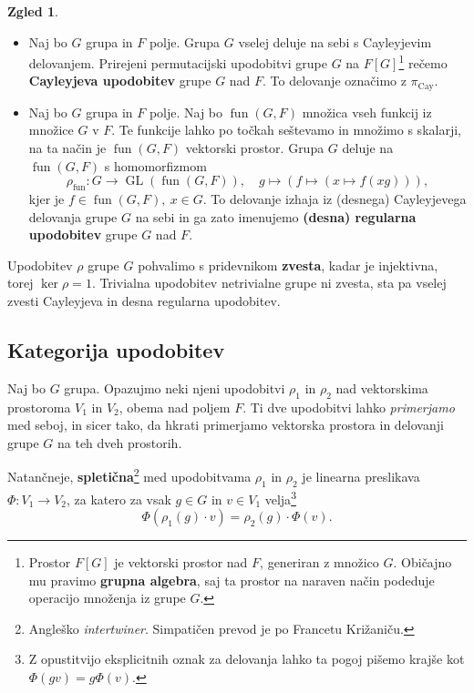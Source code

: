 \documentclass[11pt]{book}
\DeclareMathOperator\fun{fun}
\DeclareMathOperator\GL{GL}
\DeclareMathOperator\Cay{Cay}
\def\definicija{\color{rdeca}\bf}
\theoremstyle{definition}
\theoremstyle{zgled}
\newtheorem{zgled}[theorem]{Zgled}
\theoremstyle{zgledbrezstevilke}
\theoremstyle{odprtproblem}
\theoremstyle{domacanaloga}
\theoremstyle{izrek}
\begin{document}
\begin{zgled}
\begin{itemize}
        Za konkreten zgled lahko vzamemo $G = S_n$, ki naravno deluje na množici $X = \{ 1, 2, \dots, n \}$. Na ta način dobimo permutacijsko upodobitev grupe $S_n$ na prostoru $F[\{ 1, 2, \dots, n \}]$ razsežnosti $n$.
        \item Naj bo $G$ grupa in $F$ polje. Grupa $G$ vselej deluje na sebi s Cayleyjevim delovanjem. Prirejeni permutacijski upodobitvi grupe $G$ na $F[G]$\footnote{Prostor $F[G]$ je vektorski prostor nad $F$, generiran z množico $G$. Običajno mu pravimo {\definicija grupna algebra}, saj ta prostor na naraven način podeduje operacijo množenja iz grupe $G$.} rečemo {\definicija Cayleyjeva upodobitev} grupe $G$ nad $F$. To delovanje označimo z $\pi_{\Cay}$.
        \item Naj bo $G$ grupa in $F$ polje. Naj bo $\fun(G,F)$ množica vseh funkcij iz množice $G$ v $F$. Te funkcije lahko po točkah seštevamo in množimo s skalarji, na ta način je $\fun(G,F)$ vektorski prostor. Grupa $G$ deluje na $\fun(G,F)$ s homomorfizmom
        \[
            \rho_{\fun} \colon G \to \GL(\fun(G,F)), \quad
            g \mapsto \left( f \mapsto \left( x \mapsto f(xg) \right) \right),
        \]
        kjer je $f \in \fun(G,F), \ x \in G$. To delovanje izhaja iz (desnega) Cayleyjevega delovanja grupe $G$ na sebi in ga zato imenujemo {\definicija (desna) regularna upodobitev} grupe $G$ nad $F$.
    \end{itemize}
\end{zgled}

Upodobitev $\rho$ grupe $G$ pohvalimo s pridevnikom {\definicija zvesta}, kadar je injektivna, torej $\ker \rho = 1$. Trivialna upodobitev netrivialne grupe ni zvesta, sta pa vselej zvesti Cayleyjeva in desna regularna upodobitev.

\subsection{Kategorija upodobitev}

Naj bo $G$ grupa. Opazujmo neki njeni upodobitvi $\rho_1$ in $\rho_2$ nad vektorskima prostoroma $V_1$ in $V_2$, obema nad poljem $F$. Ti dve upodobitvi lahko \emph{primerjamo} med seboj, in sicer tako, da hkrati primerjamo vektorska prostora in delovanji grupe $G$ na teh dveh prostorih. 

Natančneje, {\definicija spletična}\footnote{Angleško \emph{intertwiner}. Simpatičen prevod je po Francetu Križaniču.} med upodobitvama $\rho_1$ in $\rho_2$ je linearna preslikava $\Phi \colon V_1 \to V_2$, za katero za vsak $g \in G$ in $v \in V_1$ velja\footnote{Z opustitvijo eksplicitnih oznak za delovanja lahko ta pogoj pišemo krajše kot $\Phi(gv) = g\Phi(v)$.}
\[
  \Phi(\rho_1(g) \cdot v) = \rho_2(g) \cdot \Phi(v).
\]
\end{document}
